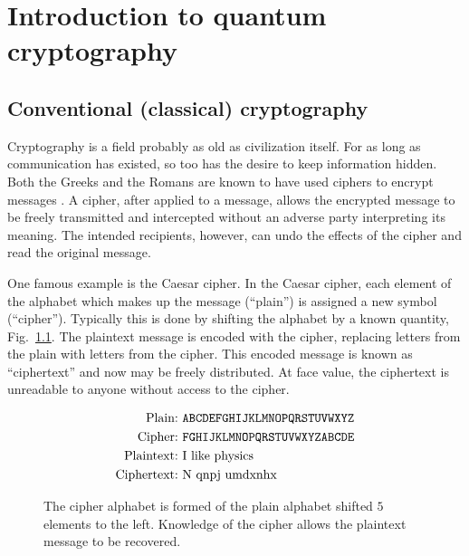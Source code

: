 \chapter{Introduction to quantum cryptography}\label{chapter:crypto_intro}

\section{Conventional (classical) cryptography}

Cryptography is a field probably as old as civilization itself. For as long as communication has existed, so too has the desire to keep information hidden. Both the Greeks and the Romans are known to have used ciphers to encrypt messages \cite{Singh2000}. A cipher, after applied to a message, allows the encrypted message to be freely transmitted and intercepted without an adverse party interpreting its meaning. The intended recipients, however, can undo the effects of the cipher and read the original message. 

One famous example is the Caesar cipher. In the Caesar cipher, each element of the alphabet which makes up the message (``plain'') is assigned a new symbol (``cipher''). Typically this is done by shifting the alphabet by a known quantity, Fig.~\ref{fig:caesar}. The plaintext message is encoded with the cipher, replacing letters from the plain with letters from the cipher. This encoded message is known as ``ciphertext'' and now may be freely distributed. At face value, the ciphertext is unreadable to anyone without access to the cipher.

\begin{figure}[htp]
\centering
\captionsetup{width=\linewidth}
\begin{framed}
\begin{align*}
\text{Plain:} &\text{  \texttt{ABCDEFGHIJKLMNOPQRSTUVWXYZ}} \\
\text{Cipher:} &\text{  \texttt{FGHIJKLMNOPQRSTUVWXYZABCDE}} \\
\text{Plaintext:} &\text{  I like physics} \\
\text{Ciphertext:} &\text{  N qnpj umdxnhx}
\end{align*}
\end{framed}
\caption{\label{fig:caesar} The cipher alphabet is formed of the plain alphabet shifted $5$ elements to the left. Knowledge of the cipher allows the plaintext message to be recovered.}
\end{figure} %


